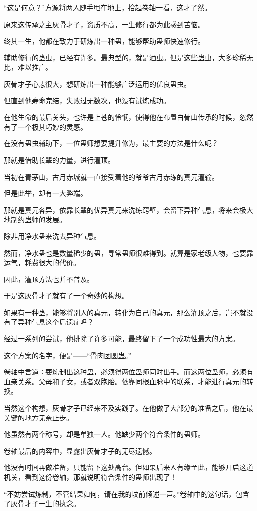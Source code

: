 \begin{this_body}
“这是何意？”方源将两人随手甩在地上，拾起卷轴一看，这才了然。

原来这传承之主灰骨才子，资质不高，一生修行都为此感到苦恼。

终其一生，他都在致力于研炼出一种蛊，能够帮助蛊师快速修行。

辅助修行的蛊虫，已经有许多。最典型的，就是酒虫。但是这些蛊虫，大多珍稀无比，难以推广。

灰骨才子心志很大，想研炼出一种能够广泛运用的优良蛊虫。

但直到他寿命完结，失败过无数次，也没有试炼成功。

在他生命的最后关头，也许是上苍的怜悯，使得他在布置白骨山传承的时候，忽然有了一个极其巧妙的灵感。

在没有蛊虫辅助下，一位蛊师想要提升修为，最主要的方法是什么呢？

那就是借助长辈的力量，进行灌顶。

当初在青茅山，古月赤城就一直接受着他的爷爷古月赤练的真元灌输。

但是此举，却有一大弊端。

那就是真元各异，依靠长辈的优异真元来洗练窍壁，会留下异种气息，将来会极大地制约蛊师的发展。

除非用净水蛊来洗去异种气息。

然而，净水蛊也是数量稀少的蛊，寻常蛊师很难得到。就算是家老级人物，也要靠运气，耗费很大的代价。

因此，灌顶方法也并不普及。

于是这灰骨才子就有了一个奇妙的构想。

如果有一种蛊，能够将别人的真元，转化为自己的真元，那么灌顶之后，岂不就没有了异种气息这个后遗症吗？

经过一系列的尝试，他排除了许多可能，最终留下了一个成功性最大的方案。

这个方案的名字，便是——“骨肉团圆蛊。”

卷轴中言道：要炼制出这种蛊，必须得两位蛊师同时出手。而这两位蛊师，必须有血亲关系。父母和子女，或者双胞胎。依靠同根血脉中的联系，才能进行真元的转换。

当然这个构想，灰骨才子已经来不及实践了。在他做了大部分的准备之后，他在最关键的地方无奈止步。

他虽然有两个称号，却是单独一人。他缺少两个符合条件的蛊师。

卷轴最后的内容中，显露出灰骨才子的无尽遗憾。

他没有时间再做准备，只能留下这处高台。但如果后来人有缘至此，能够开启这道机关，看到这份卷轴，那就说明符合条件的蛊师出现了！

“不妨尝试炼制，不管结果如何，请在我的坟前倾述一声。”卷轴中的这句话，包含了灰骨才子一生的执念。


\end{this_body}
